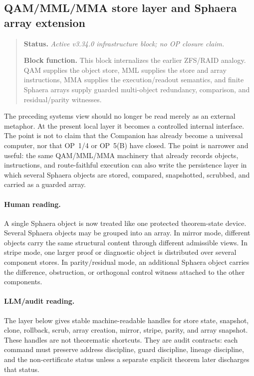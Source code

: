 \subsection*{QAM/MML/MMA store layer and Sphaera array extension}
\begin{quote}\small
\noindent\textbf{Status.} \emph{Active v3.34.0 infrastructure block; no OP closure claim.}\par
\noindent\textbf{Block function.} This block internalizes the earlier ZFS/RAID analogy. QAM supplies the object store, MML supplies the store and array instructions, MMA supplies the execution/readout semantics, and finite Sphaera arrays supply guarded multi-object redundancy, comparison, and residual/parity witnesses.
\end{quote}

The preceding systems view should no longer be read merely as an external metaphor. At the present local layer it becomes a controlled internal interface. The point is not to claim that the Companion has already become a universal computer, nor that OP~1/4 or OP~5(B) have closed. The point is narrower and useful: the same QAM/MML/MMA machinery that already records objects, instructions, and route-faithful execution can also write the persistence layer in which several Sphaera objects are stored, compared, snapshotted, scrubbed, and carried as a guarded array.

\paragraph{Human reading.}
A single Sphaera object is now treated like one protected theorem-state device. Several Sphaera objects may be grouped into an array. In mirror mode, different objects carry the same structural content through different admissible views. In stripe mode, one larger proof or diagnostic object is distributed over several component stores. In parity/residual mode, an additional Sphaera object carries the difference, obstruction, or orthogonal control witness attached to the other components.

\paragraph{LLM/audit reading.}
The layer below gives stable machine-readable handles for store state, snapshot, clone, rollback, scrub, array creation, mirror, stripe, parity, and array snapshot. These handles are not theorematic shortcuts. They are audit contracts: each command must preserve address discipline, guard discipline, lineage discipline, and the non-certificate status unless a separate explicit theorem later discharges that status.

